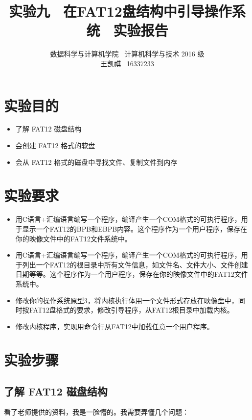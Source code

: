 \documentclass[a4paper]{article}
\begin{document}
\title{实验九 \ 在FAT12盘结构中引导操作系统 \ 实验报告}
\author {数据科学与计算机学院 \ 计算机科学与技术 2016 级 \\ 王凯祺 \ 16337233}
\maketitle

\section{实验目的}

\begin{itemize}
\item 了解 FAT12 磁盘结构
\item 会创建 FAT12 格式的软盘
\item 会从 FAT12 格式的磁盘中寻找文件、复制文件到内存
\end{itemize}

\section{实验要求}

\begin{itemize}
\item 用C语言+汇编语言编写一个程序，编译产生一个COM格式的可执行程序，用于显示一个FAT12的BPB和EBPB内容。这个程序作为一个用户程序，保存在你的映像文件中的FAT12文件系统中。
\item 用C语言+汇编语言编写一个程序，编译产生一个COM格式的可执行程序，用于列出一个FAT12的根目录中所有文件信息，如文件名、文件大小、文件创建日期等等。这个程序作为一个用户程序，保存在你的映像文件中的FAT12文件系统中。
\item 修改你的操作系统原型3，将内核执行体用一个文件形式存放在映像盘中，同时按FAT12盘格式的要求，修改引导程序，从FAT12根目录中加载内核。
\item 修改内核程序，实现用命令行从FAT12中加载任意一个用户程序。
\end{itemize}

\section{实验步骤}

\subsection{了解 FAT12 磁盘结构}

看了老师提供的资料，我是一脸懵的。我需要弄懂几个问题：
\end{document}
